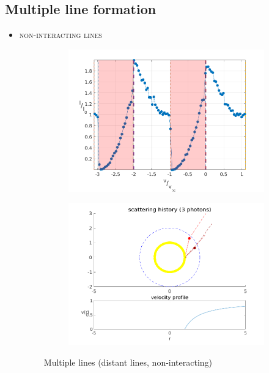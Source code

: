 \documentclass[../main/main.tex]{subfiles}
\begin{document}
\newpage
\subsection{Multiple line formation}
\begin{itemize}
\item \textsc{non-interacting lines}
	\begin{figure}[H]
	\centering	
	\hspace*{-0.5in}
	\begin{subfigure}{.6\textwidth}
	\includegraphics[width=1\textwidth]{../../two_resonance_lines/figures/multiple_lines_distant.png}
	\end{subfigure}%
	\begin{subfigure}{.6\textwidth}
	\includegraphics[width=1\textwidth]{../../two_resonance_lines/figures/multiple_lines_photon_path_distant.png}
	\end{subfigure}
	\caption{Multiple lines (distant lines, non-interacting)}
	\label{multiple_lines_1}
	\end{figure}
	

\end{itemize}
\end{document}
